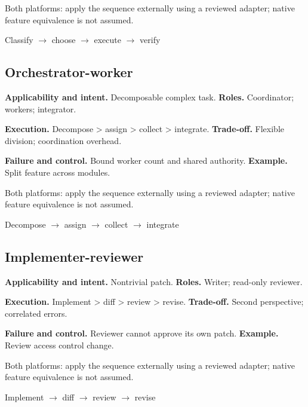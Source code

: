 Both platforms: apply the sequence externally using a reviewed adapter; native feature equivalence is not assumed.

\begin{center}\small \textsf{Classify} $\rightarrow$ \textsf{choose} $\rightarrow$ \textsf{execute} $\rightarrow$ \textsf{verify}\end{center}

\subsection{Orchestrator-worker}

\textbf{Applicability and intent.} Decomposable complex task. \textbf{Roles.} Coordinator; workers; integrator.

\textbf{Execution.} Decompose > assign > collect > integrate. \textbf{Trade-off.} Flexible division; coordination overhead.

\textbf{Failure and control.} Bound worker count and shared authority. \textbf{Example.} Split feature across modules.

Both platforms: apply the sequence externally using a reviewed adapter; native feature equivalence is not assumed.

\begin{center}\small \textsf{Decompose} $\rightarrow$ \textsf{assign} $\rightarrow$ \textsf{collect} $\rightarrow$ \textsf{integrate}\end{center}

\subsection{Implementer-reviewer}

\textbf{Applicability and intent.} Nontrivial patch. \textbf{Roles.} Writer; read-only reviewer.

\textbf{Execution.} Implement > diff > review > revise. \textbf{Trade-off.} Second perspective; correlated errors.

\textbf{Failure and control.} Reviewer cannot approve its own patch. \textbf{Example.} Review access control change.

Both platforms: apply the sequence externally using a reviewed adapter; native feature equivalence is not assumed.

\begin{center}\small \textsf{Implement} $\rightarrow$ \textsf{diff} $\rightarrow$ \textsf{review} $\rightarrow$ \textsf{revise}\end{center}

